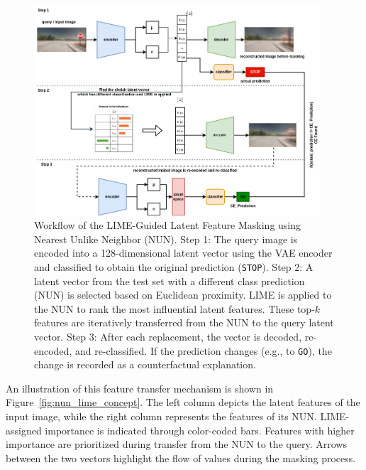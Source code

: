 \begin{figure}[h]
    \centering
    \includegraphics[width=0.95\textwidth]{img/masking/lime_on_latent_nun/lime_on_latent_featuring_using_NUN.png}
    \caption[Workflow of LIME-guided latent masking with NUN]{%
Workflow of the LIME-Guided Latent Feature Masking using Nearest Unlike Neighbor (NUN).  
Step 1: The query image is encoded into a 128-dimensional latent vector using the VAE encoder and classified to obtain the original prediction (\texttt{STOP}).  
Step 2: A latent vector from the test set with a different class prediction (NUN) is selected based on Euclidean proximity. LIME is applied to the NUN to rank the most influential latent features. These top-$k$ features are iteratively transferred from the NUN to the query latent vector.  
Step 3: After each replacement, the vector is decoded, re-encoded, and re-classified. If the prediction changes (e.g., to \texttt{GO}), the change is recorded as a counterfactual explanation.}
    \label{fig:nun_lime_workflow}
\end{figure}




An illustration of this feature transfer mechanism is shown in Figure~\ref{fig:nun_lime_concept}. The left column depicts the latent features of the input image, while the right column represents the features of its NUN. LIME-assigned importance is indicated through color-coded bars. Features with higher importance are prioritized during transfer from the NUN to the query. Arrows between the two vectors highlight the flow of values during the masking process.


